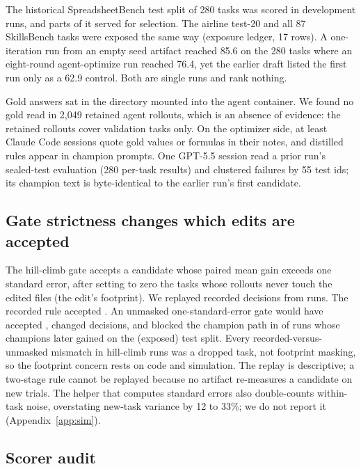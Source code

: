 The historical SpreadsheetBench test split of 280 tasks was scored in development runs, and parts of it served for selection. The airline test-20 and all 87 SkillsBench tasks were exposed the same way (exposure ledger, 17 rows). A one-iteration run from an empty seed artifact reached 85.6 on the 280 tasks where an eight-round agent-optimize run reached 76.4, yet the earlier draft listed the first run only as a 62.9 control. Both are single runs and rank nothing.

Gold answers sat in the directory mounted into the agent container. We found no gold read in 2{,}049 retained agent rollouts, which is an absence of evidence: the retained rollouts cover validation tasks only. On the optimizer side, at least \goldOptimizerRuns{} Claude Code sessions quote gold values or formulas in their notes, and distilled rules appear in champion prompts. One GPT-5.5 session read a prior run's sealed-test evaluation (280 per-task results) and clustered failures by 55 test ids; its champion text is byte-identical to the earlier run's first candidate.

\subsection*{Gate strictness changes which edits are accepted}

The hill-climb gate accepts a candidate whose paired mean gain exceeds one standard error, after setting to zero the tasks whose rollouts never touch the edited files (the edit's footprint). We replayed \replayDecisions{} recorded decisions from \replayRuns{} runs. The recorded rule accepted \replayRecorded{}. An unmasked one-standard-error gate would have accepted \replayUnmasked{}, changed \replayFlipsUnmasked{} decisions, and blocked the champion path in \replayBlockedRuns{} of \replayPathRuns{} runs whose champions later gained on the (exposed) test split. Every recorded-versus-unmasked mismatch in hill-climb runs was a dropped task, not footprint masking, so the footprint concern rests on code and simulation. The replay is descriptive; a two-stage rule cannot be replayed because no artifact re-measures a candidate on new trials. The helper that computes standard errors also double-counts within-task noise, overstating new-task variance by 12 to 33\%; we do not report it (Appendix~\ref{app:sim}).

\subsection*{Scorer audit}
\label{app:scorer}

